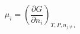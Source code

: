 \documentclass[preview]{standalone}
\begin{document}
\[\mu_i = \left(\frac{\partial G}{\partial n_i}\right)_{T, P, n_{j \neq i}}\]
\end{document}

